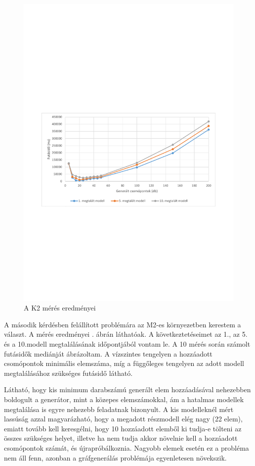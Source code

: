 \begin{figure}[htp]
	\centering
	\includegraphics[width=1\textwidth]{figures/statisticsPlottal1}
	\caption{A K2 mérés eredményei}
	\label{fig:BmeresEredmeny}
\end{figure}

A második kérdésben felállított problémára az M2-es környezetben kerestem a választ. A mérés eredményei . ábrán láthatóak. A következtetéseimet az 1., az 5. és a 10.modell megtalálásának  időpontjából vontam le. A 10 mérés során számolt futásidők mediánját ábrázoltam. A vízszintes tengelyen a hozzáadott csomópontok minimális elemszáma, míg a függőleges tengelyen az adott modell megtalálásához szükséges futásidő látható. 

Látható, hogy kis minimum darabszámú generált elem hozzáadásával nehezebben boldogult a generátor, mint a közepes elemszámokkal, ám a hatalmas modellek megtalálása is egyre nehezebb feladatnak bizonyult. A kis modelleknél mért lassúság azzal magyarázható, hogy a megadott részmodell elég nagy (22 elem), emiatt tovább kell keresgélni, hogy 10 hozzáadott elemből ki tudja-e tölteni az összes szükséges helyet, illetve ha nem tudja akkor növelnie kell a hozzáadott csomópontok számát, és újrapróbálkoznia. Nagyobb elemek esetén ez a probléma nem áll fenn, azonban a gráfgenerálás problémája egyenletesen növekszik.

